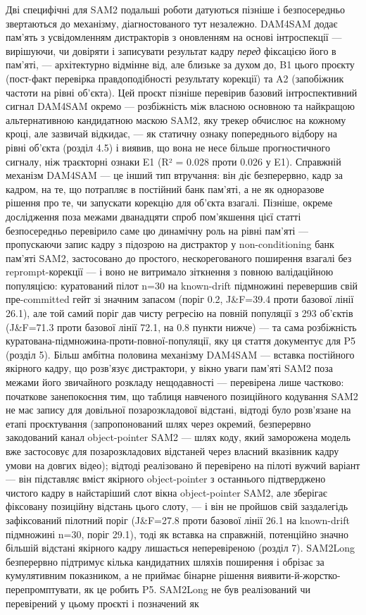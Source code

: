 \documentclass[11pt]{article}
\begin{document}
Дві специфічні для SAM2 подальші роботи датуються пізніше і безпосередньо звертаються до механізму, діагностованого тут незалежно. DAM4SAM \citep{videnovic2024} додає пам'ять з усвідомленням дистракторів з оновленням на основі інтроспекції --- вирішуючи, чи довіряти і записувати результат кадру \emph{перед} фіксацією його в пам'яті, --- архітектурно відмінне від, але близьке за духом до, B1 цього проєкту (пост-факт перевірка правдоподібності результату корекції) та A2 (запобіжник частоти на рівні об'єкта). Цей проєкт пізніше перевірив базовий інтроспективний сигнал DAM4SAM окремо --- розбіжність між власною основною та найкращою альтернативною кандидатною маскою SAM2, яку трекер обчислює на кожному кроці, але зазвичай відкидає, --- як статичну ознаку попереднього відбору на рівні об'єкта (розділ 4.5) і виявив, що вона не несе більше прогностичного сигналу, ніж траєкторні ознаки E1 (R² = 0.028 проти 0.026 у E1). Справжній механізм DAM4SAM --- це інший тип втручання: він діє безперервно, кадр за кадром, на те, що потрапляє в постійний банк пам'яті, а не як одноразове рішення про те, чи запускати корекцію для об'єкта взагалі. Пізніше, окреме дослідження поза межами дванадцяти спроб пом'якшення цієї статті безпосередньо перевірило саме цю динамічну роль на рівні пам'яті --- пропускаючи запис кадру з підозрою на дистрактор у non-conditioning банк пам'яті SAM2, застосовано до простого, нескорегованого поширення взагалі без reprompt-корекції --- і воно не витримало зіткнення з повною валідаційною популяцією: куратований пілот n=30 на known-drift підмножині перевершив свій пре-committed гейт зі значним запасом (поріг 0.2, J\&F=39.4 проти базової лінії 26.1), але той самий поріг дав чисту регресію на повній популяції з 293 об'єктів (J\&F=71.3 проти базової лінії 72.1, на 0.8 пункти нижче) --- та сама розбіжність куратована-підмножина-проти-повної-популяції, яку ця стаття документує для P5 (розділ 5). Більш амбітна половина механізму DAM4SAM --- вставка постійного якірного кадру, що розв'язує дистрактори, у вікно уваги пам'яті SAM2 поза межами його звичайного розкладу нещодавності --- перевірена лише частково: початкове занепокоєння тим, що таблиця навченого позиційного кодування SAM2 не має запису для довільної позарозкладової відстані, відтоді було розв'язане на етапі проєктування (запропонований шлях через окремий, безперервно закодований канал object-pointer SAM2 --- шлях коду, який заморожена модель вже застосовує для позарозкладових відстаней через власний вказівник кадру умови на довгих відео); відтоді реалізовано й перевірено на пілоті вужчий варіант — він підставляє вміст якірного object-pointer з останнього підтверджено чистого кадру в найстаріший слот вікна object-pointer SAM2, але зберігає фіксовану позиційну відстань цього слоту, — і він не пройшов свій заздалегідь зафіксований пілотний поріг (J\&F=27.8 проти базової лінії 26.1 на known-drift підмножині n=30, поріг 29.1), тоді як вставка на справжній, потенційно значно більшій відстані якірного кадру лишається неперевіреною (розділ 7). SAM2Long \citep{ding2024} безперервно підтримує кілька кандидатних шляхів поширення і обрізає за кумулятивним показником, а не приймає бінарне рішення виявити-й-жорстко-перепромптувати, як це робить P5. SAM2Long не був реалізований чи перевірений у цьому проєкті і позначений як 
\end{document}
